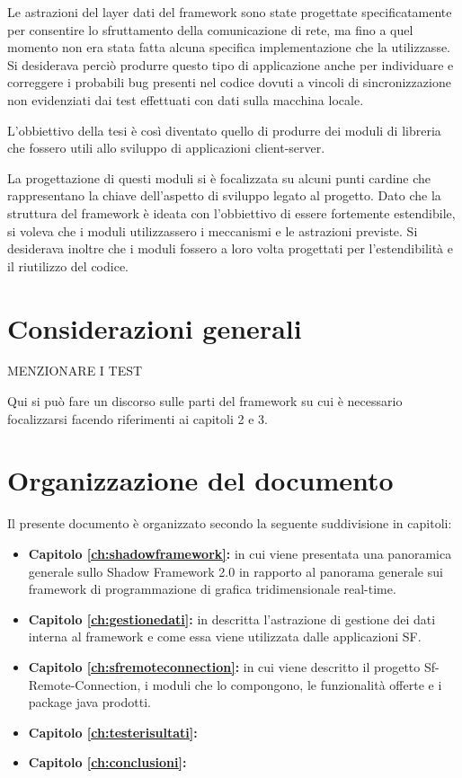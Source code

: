 Le astrazioni del layer dati del framework sono state progettate specificatamente per consentire lo sfruttamento della comunicazione di rete, ma fino a quel momento non era stata fatta alcuna specifica implementazione che la utilizzasse. Si desiderava perciò produrre questo tipo di applicazione anche per individuare e correggere i probabili bug presenti nel codice dovuti a vincoli di sincronizzazione non evidenziati dai test effettuati con dati sulla macchina locale.

L'obbiettivo della tesi è così diventato quello di produrre dei moduli di libreria che fossero utili allo sviluppo di applicazioni client-server.

La progettazione di questi moduli si è focalizzata su alcuni punti cardine che rappresentano la chiave dell'aspetto di sviluppo legato al progetto. Dato che la struttura del framework è ideata con l'obbiettivo di essere fortemente estendibile, si voleva che i moduli utilizzassero i meccanismi e le astrazioni previste.
Si desiderava inoltre che i moduli fossero a loro volta progettati per l'estendibilità e il riutilizzo del codice.


\section{Considerazioni generali}
\label{sec:considerazioni}
MENZIONARE I TEST

Qui si può fare un discorso sulle parti del framework su cui è necessario focalizzarsi facendo riferimenti ai capitoli 2 e 3.

\section{Organizzazione del documento}
\label{sec:orgtesi}
Il presente documento è organizzato secondo la seguente suddivisione in capitoli:
\begin{itemize}
	\item  \textbf{Capitolo \ref{ch:shadowframework}:} in cui viene presentata una panoramica generale sullo Shadow Framework 2.0 in rapporto al panorama generale sui framework di programmazione di grafica tridimensionale real-time.
	\item  \textbf{Capitolo \ref{ch:gestionedati}:} in descritta l'astrazione di gestione dei dati interna al framework e come essa viene utilizzata dalle applicazioni \ac{SF}.
	\item  \textbf{Capitolo \ref{ch:sfremoteconnection}:} in cui viene descritto il progetto Sf-Remote-Connection, i moduli che lo compongono, le funzionalità offerte e i package java prodotti.
	\item  \textbf{Capitolo \ref{ch:testerisultati}:}
	\item  \textbf{Capitolo \ref{ch:conclusioni}:}
\end{itemize}


